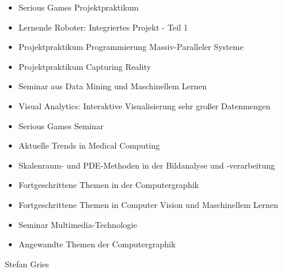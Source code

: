 {\begin{itemize}[noitemsep]
  \item Serious Games Projektpraktikum
  \item Lernende Roboter: Integriertes Projekt - Teil 1
  \item Projektpraktikum Programmierung Massiv-Paralleler Systeme
  \item Projektpraktikum Capturing Reality
  \item Seminar aus Data Mining und Maschinellem Lernen
  \item Visual Analytics: Interaktive Visualisierung sehr großer Datenmengen
  \item Serious Games Seminar
  \item Aktuelle Trends in Medical Computing
  \item Skalenraum- und PDE-Methoden in der Bildanalyse und -verarbeitung
  \item Fortgeschrittene Themen in der Computergraphik
  \item Fortgeschrittene Themen in Computer Vision und Maschinellem Lernen
  \item Seminar Multimedia-Technologie
  \item Angewandte Themen der Computergraphik
\end{itemize}
}
{Stefan Gries}
